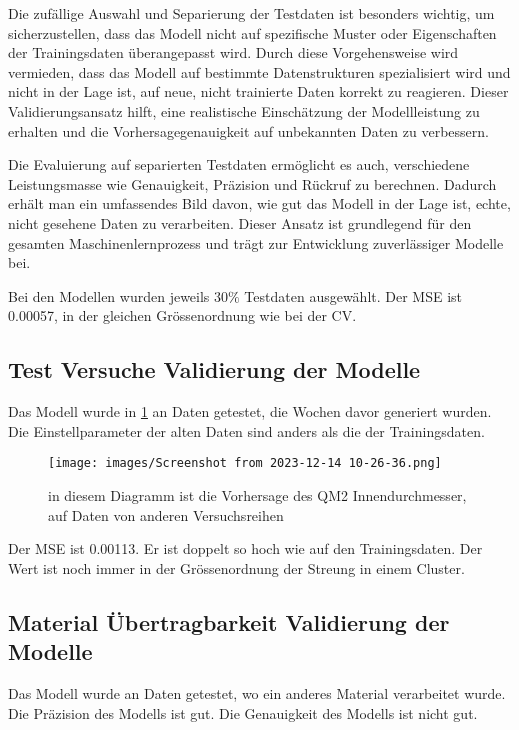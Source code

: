 Die zufällige Auswahl und Separierung der Testdaten ist besonders wichtig, um sicherzustellen, dass das Modell nicht auf spezifische Muster oder Eigenschaften der Trainingsdaten überangepasst wird. Durch diese Vorgehensweise wird vermieden, dass das Modell auf bestimmte Datenstrukturen spezialisiert wird und nicht in der Lage ist, auf neue, nicht trainierte Daten korrekt zu reagieren. Dieser Validierungsansatz hilft, eine realistische Einschätzung der Modellleistung zu erhalten und die Vorhersagegenauigkeit auf unbekannten Daten zu verbessern.

Die Evaluierung auf separierten Testdaten ermöglicht es auch, verschiedene Leistungsmasse wie Genauigkeit, Präzision und Rückruf zu berechnen. Dadurch erhält man ein umfassendes Bild davon, wie gut das Modell in der Lage ist, echte, nicht gesehene Daten zu verarbeiten. Dieser Ansatz ist grundlegend für den gesamten Maschinenlernprozess und trägt zur Entwicklung zuverlässiger Modelle bei.

Bei den Modellen wurden jeweils $30 \%$ Testdaten ausgewählt. Der MSE ist 0.00057, in der gleichen Grössenordnung wie bei der CV.

\subsection{Test Versuche Validierung der Modelle}
Das Modell wurde in \ref{fig:TestVer} an Daten getestet, die Wochen davor generiert wurden. Die Einstellparameter der alten Daten sind anders als die der Trainingsdaten.

\begin{figure} 
   
  \texttt{[image: images/Screenshot from 2023-12-14 10-26-36.png]}
  \caption{in diesem Diagramm ist die Vorhersage des QM2 Innendurchmesser, auf Daten von anderen Versuchsreihen}
  \label{fig:TestVer}
\end{figure}

Der MSE ist 0.00113. Er ist doppelt so hoch wie auf den Trainingsdaten. Der Wert ist noch immer in der Grössenordnung der Streung in einem Cluster.

\subsection{Material Übertragbarkeit Validierung der Modelle}
\label{MatVal}
Das Modell wurde an Daten getestet, wo ein anderes Material verarbeitet wurde. Die Präzision des Modells ist gut. Die Genauigkeit des Modells ist nicht gut.

